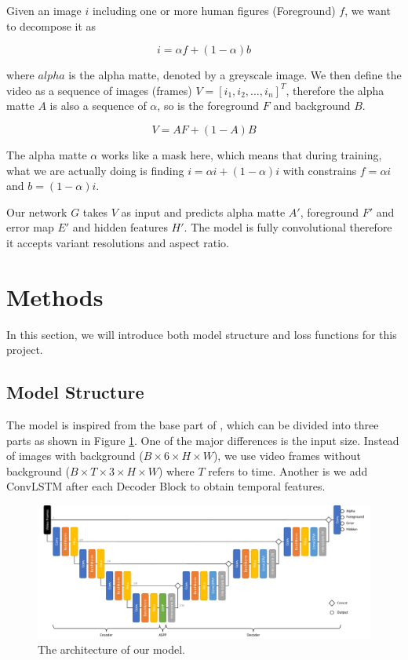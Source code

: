 \documentclass[final]{cvpr}
\begin{document}
Given an image $i$ including one or more human figures (Foreground) $f$, we want to decompose it as

\begin{equation}
    i=\alpha f+(1-\alpha)b
\end{equation}\label{formulationImage}

where $alpha$ is the alpha matte, denoted by a greyscale image.
We then define the video as a sequence of images (frames) $V=[i_1, i_2, \dots, i_n]^T$, therefore the alpha matte $A$ is also a sequence of $\alpha$, so is the foreground $F$ and background $B$.

\begin{equation}
    V=AF+(1-A)B
\end{equation}\label{formulationVideo}

The alpha matte $\alpha$ works like a mask here, which means that during training, what we are actually doing is finding $i=\alpha i+(1-\alpha)i$ with constrains $f=\alpha i$ and $b=(1-\alpha)i$.

Our network $G$ takes $V$ as input and predicts alpha matte $A'$, foreground $F'$ and error map $E'$ and hidden features $H'$. The model is fully convolutional therefore it accepts variant resolutions and aspect ratio.

\section{Methods}

In this section, we will introduce both model structure and loss functions for this project.

\subsection{Model Structure}

The model is inspired from the base part of \cite{linRealTimeHighResolutionBackground2020a}, which can be divided into three parts as shown in Figure \ref{modelConvLSTM}. One of the major differences is the input size. Instead of images with background ($B\times 6\times H \times W$), we use video frames without background ($B\times T\times 3\times H \times W$) where $T$ refers to time. Another is we add ConvLSTM after each Decoder Block to obtain temporal features.

\begin{figure}[htb]
    \begin{center}
        \includegraphics[width=1\textwidth]{img/modelConvLSTM.pdf}
    \end{center}
    \caption{The architecture of our model.}
    \label{modelConvLSTM}
\end{figure}
\end{document}
